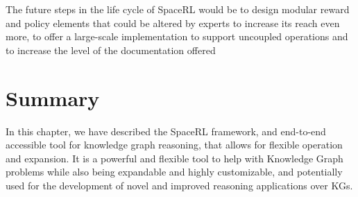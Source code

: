 The future steps in the life cycle of SpaceRL would be to design modular reward and policy elements that could be altered by experts to increase its reach even more, to offer a large-scale implementation to support uncoupled operations and to increase the level of the documentation offered

\section{Summary}\label{sec:framework-summary}
In this chapter, we have described the SpaceRL framework, and end-to-end accessible tool for knowledge graph reasoning, that allows for flexible operation and expansion. It is a powerful and flexible tool to help with Knowledge Graph problems while also being expandable and highly customizable, and potentially used for the development of novel and improved reasoning applications over KGs.